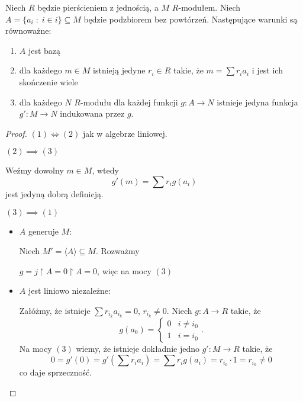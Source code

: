 \begin{remark}
  Niech $R$ będzie pierścieniem z jednością, a $M$ $R$-modułem. Niech $A=\{a_i\;:\;i\in i\}\subseteq M$ będzie podzbiorem bez powtórzeń. Następujące warunki są równoważne:
  \begin{enumerate}
    \item $A$ jest bazą
    \item dla każdego $m\in M$ istnieją jedyne $r_i\in R$ takie, że $m=\sum r_ia_i$ i jest ich skończenie wiele
    \item dla każdego $N$ $R$-modułu dla każdej funkcji $g:A\to N$ istnieje jedyna funkcja $g':M\to N$ indukowana przez $g$.
  \end{enumerate}
\end{remark}
\begin{proof}
  $(1)\iff(2)$ jak w algebrze liniowej.

  $(2)\implies(3)$

  Weźmy dowolny $m\in M$, wtedy
  $$g'(m)=\sum r_ig(a_i)$$
  jest jedyną dobrą definicją.

  $(3)\implies(1)$
  \begin{itemize}
    \item $A$ generuje $M$:

      Niech $M'=\langle A\rangle\subseteq M$. Rozważmy 

      \begin{center}\end{center}

      $g=j\restriction A=0\restriction A=0$, więc na mocy $(3)$
      \begin{center}\end{center}
    \item $A$ jest liniowo niezależne:

      Załóżmy, że istnieje $\sum r_{i_k}a_{i_k}=0$, $r_{i_k}\neq 0$. Niech $g:A\to R$ takie, że
      $$g(a_0)=\begin{cases}0&i\neq i_0\\1&i=i_0\end{cases}.$$
      Na mocy $(3)$ wiemy, że istnieje dokładnie jedno $g':M\to R$ takie, że
      $$0=g'(0)=g'(\sum r_ia_i)=\sum r_ig(a_i)=r_{i_0}\cdot 1=r_{i_0}\neq 0$$
      co daje sprzeczność.
  \end{itemize}
\end{proof}


